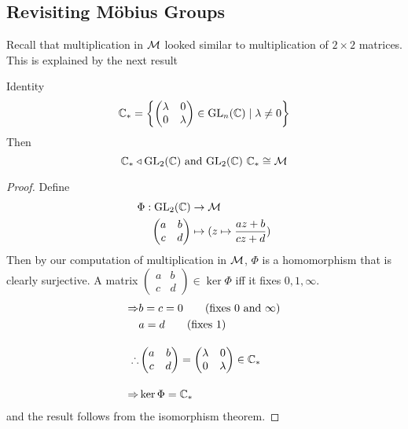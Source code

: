 \documentclass{article}
\begin{document}
\subsection{Revisiting M\"obius Groups}
Recall that multiplication in $\mathcal{M}$ looked similar to multiplication of $2 \times 2$ matrices.
This is explained by the next result
\begin{prop}
    Identity 
    \[
        \mathbb{C}_\ast = \left\{ 
            \begin{pmatrix}
                \lambda & 0\\
                0 & \lambda
            \end{pmatrix} 
            \in \mathrm{GL}_n(\mathbb{C}) \mid \lambda \neq 0
         \right\}
    \]
    Then
    \[
        \mathbb{C}_\ast \triangleleft \mathrm{GL}_2(\mathbb{C}) \text{ and } \mathrm{GL}_2(\mathbb{C}) \ \mathbb{C}_\ast \cong \mathcal{M}
    \]
\end{prop}
\begin{proof}
    Define
    \begin{align*}
        \Phi: \mathrm{GL}_2(\mathbb{C}) &\rightarrow \mathcal{M} \\
        \begin{pmatrix}
            a & b \\
            c & d
        \end{pmatrix}
        &\mapsto (z \mapsto \frac{az + b}{cz + d})
    \end{align*}
    Then by our computation of multiplication in $\mathcal{M}$, $\Phi$ is a homomorphism that is clearly surjective.
    A matrix $\begin{pmatrix}
        a & b \\
        c & d
    \end{pmatrix} \in \ker \Phi$ iff it fixes $0, 1, \infty$.
    \begin{align*}
        \Rightarrow & b = c = 0 \tag{fixes $0$ and $\infty$} \\
        & a = d \tag{fixes $1$} \\[10pt]
        \therefore & \begin{pmatrix}
            a & b \\
            c & d
        \end{pmatrix} = \begin{pmatrix}
            \lambda & 0 \\
            0 & \lambda
        \end{pmatrix} \in \mathbb{C}_\ast \\[10pt]
        \Rightarrow & \ker \Phi = \mathbb{C}_\ast
    \end{align*}
    and the result follows from the isomorphism theorem.
\end{proof}
\end{document}
